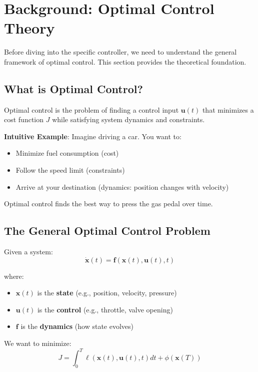 \documentclass[11pt,a4paper]{article}
\begin{document}
\section{Background: Optimal Control Theory}

Before diving into the specific controller, we need to understand the general framework of optimal control. This section provides the theoretical foundation.

\subsection{What is Optimal Control?}

Optimal control is the problem of finding a control input $\mathbf{u}(t)$ that minimizes a cost function $J$ while satisfying system dynamics and constraints.

\textbf{Intuitive Example}: Imagine driving a car. You want to:
\begin{itemize}
    \item Minimize fuel consumption (cost)
    \item Follow the speed limit (constraints)
    \item Arrive at your destination (dynamics: position changes with velocity)
\end{itemize}

Optimal control finds the best way to press the gas pedal over time.

\subsection{The General Optimal Control Problem}

Given a system:
\begin{equation}
\dot{\mathbf{x}}(t) = \mathbf{f}(\mathbf{x}(t), \mathbf{u}(t), t)
\end{equation}

where:
\begin{itemize}
    \item $\mathbf{x}(t)$ is the \textbf{state} (e.g., position, velocity, pressure)
    \item $\mathbf{u}(t)$ is the \textbf{control} (e.g., throttle, valve opening)
    \item $\mathbf{f}$ is the \textbf{dynamics} (how state evolves)
\end{itemize}

We want to minimize:
\begin{equation}
J = \int_0^T \ell(\mathbf{x}(t), \mathbf{u}(t), t) dt + \phi(\mathbf{x}(T))
\end{equation}
\end{document}
